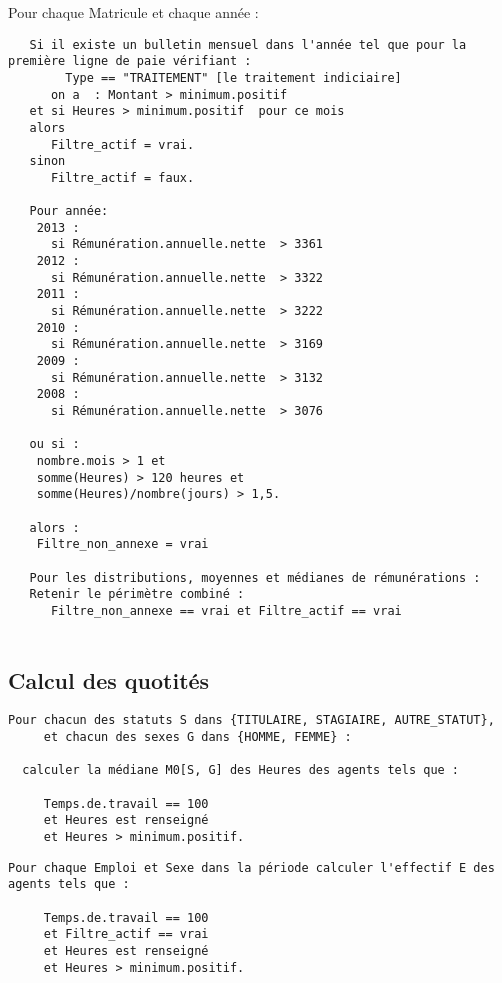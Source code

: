 \documentclass[]{article}
\begin{document}
Pour chaque Matricule et chaque année :

\begin{verbatim}
   Si il existe un bulletin mensuel dans l'année tel que pour la première ligne de paie vérifiant :
        Type == "TRAITEMENT" [le traitement indiciaire]  
      on a  : Montant > minimum.positif  
   et si Heures > minimum.positif  pour ce mois
   alors   
      Filtre_actif = vrai.  
   sinon  
      Filtre_actif = faux.  
      
   Pour année:
    2013 :
      si Rémunération.annuelle.nette  > 3361
    2012 :
      si Rémunération.annuelle.nette  > 3322
    2011 :
      si Rémunération.annuelle.nette  > 3222
    2010 :
      si Rémunération.annuelle.nette  > 3169
    2009 :
      si Rémunération.annuelle.nette  > 3132
    2008 :
      si Rémunération.annuelle.nette  > 3076  
      
   ou si :
    nombre.mois > 1 et   
    somme(Heures) > 120 heures et  
    somme(Heures)/nombre(jours) > 1,5.   
   
   alors :
    Filtre_non_annexe = vrai
    
   Pour les distributions, moyennes et médianes de rémunérations :   
   Retenir le périmètre combiné : 
      Filtre_non_annexe == vrai et Filtre_actif == vrai
    
\end{verbatim}

\subsection{Calcul des quotités}\label{calcul-des-quotites}

\begin{verbatim}
Pour chacun des statuts S dans {TITULAIRE, STAGIAIRE, AUTRE_STATUT},    
     et chacun des sexes G dans {HOMME, FEMME} :  

  calculer la médiane M0[S, G] des Heures des agents tels que :  
  
     Temps.de.travail == 100   
     et Heures est renseigné   
     et Heures > minimum.positif.  
\end{verbatim}

\begin{verbatim}
Pour chaque Emploi et Sexe dans la période calculer l'effectif E des agents tels que :
   
     Temps.de.travail == 100   
     et Filtre_actif == vrai
     et Heures est renseigné   
     et Heures > minimum.positif.  
\end{verbatim}
\end{document}
